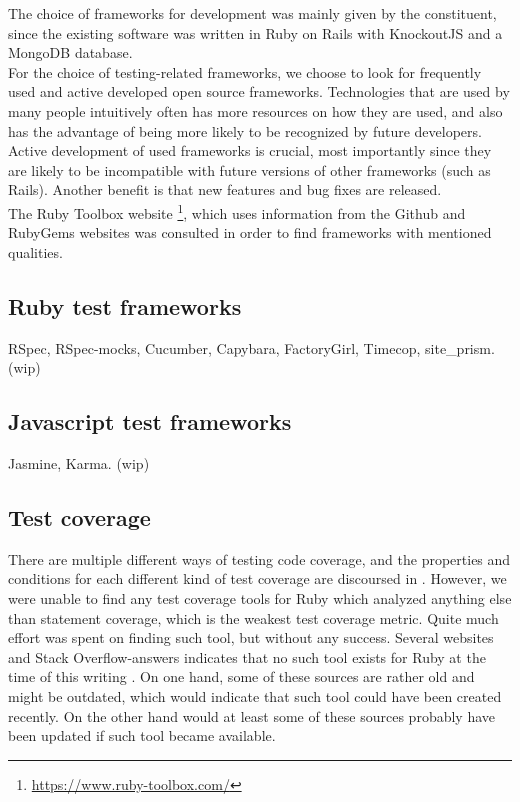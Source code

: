 
The choice of frameworks for development was mainly given by the
constituent, since the existing software was written in Ruby on Rails
with KnockoutJS and a MongoDB database.\\

For the choice of testing-related frameworks, we choose to look for
frequently used and active developed open source frameworks.
Technologies that are used by many people intuitively often has more
resources on how they are used, and also has the advantage of being more
likely to be recognized by future developers. Active development of used
frameworks is crucial, most importantly since they are likely to be
incompatible with future versions of other frameworks (such as Rails).
Another benefit is that new features and bug fixes are released.\\

The Ruby Toolbox website \footnote{\url{https://www.ruby-toolbox.com/}},
which uses information from the Github and RubyGems websites was
consulted in order to find frameworks with mentioned qualities.\\

\subsection{Ruby test frameworks}
RSpec, RSpec-mocks, Cucumber, Capybara, FactoryGirl, Timecop, site\_prism. (wip)

\subsection{Javascript test frameworks}
Jasmine, Karma. (wip)

\subsection{Test coverage}
\label{sec:coverage_frameworks}

There are multiple different ways of testing code coverage, and the
properties and conditions for each different kind of test coverage are
discoursed in . However, we were unable to find any
test coverage tools for Ruby which analyzed anything else than statement
coverage, which is the weakest test coverage metric. Quite much effort
was spent on finding such tool, but without any success. Several
websites and Stack Overflow-answers indicates that no such tool exists
for Ruby at the time of this writing \cite{web:coverage_ruby19,
so:c1c2_coverage, so:c1_coverage, web:toolbox_code_metrics}. On one
hand, some of these sources are rather old and might be outdated, which
would indicate that such tool could have been created recently. On the
other hand would at least some of these sources probably have been
updated if such tool became available.\\


